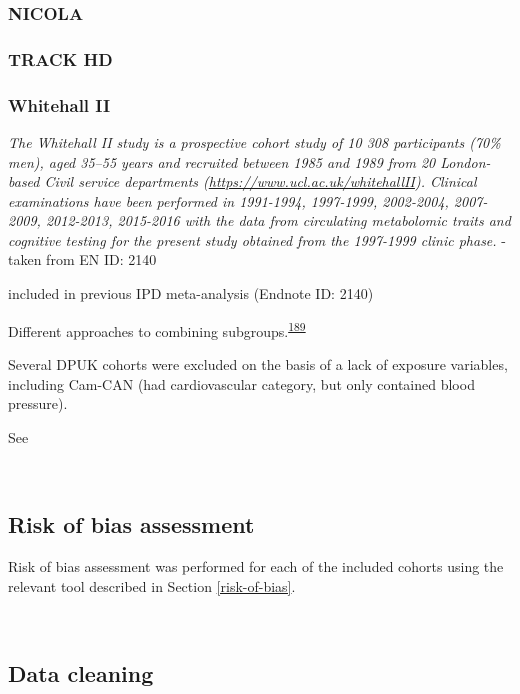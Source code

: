 \documentclass[a4paper, twoside]{templates/ociamthesis}
\begin{document}
\hypertarget{nicola}{%
\subsubsection{NICOLA}\label{nicola}}

\hypertarget{track-hd}{%
\subsubsection{TRACK HD}\label{track-hd}}

\hypertarget{whitehall-ii}{%
\subsubsection{Whitehall II}\label{whitehall-ii}}

\emph{The Whitehall II study is a prospective cohort study of 10 308 participants (70\% men), aged 35--55 years and recruited between 1985 and 1989 from 20 London-based Civil service departments (\url{https://www.ucl.ac.uk/whitehallII}). Clinical examinations have been performed in 1991-1994, 1997-1999, 2002-2004, 2007-2009, 2012-2013, 2015-2016 with the data from circulating metabolomic traits and cognitive testing for the present study obtained from the 1997-1999 clinic phase.} - taken from EN ID: 2140

included in previous IPD meta-analysis (Endnote ID: 2140)

Different approaches to combining subgroups.\textsuperscript{\protect\hyperlink{ref-fisher2017}{189}}

Several DPUK cohorts were excluded on the basis of a lack of exposure variables, including Cam-CAN (had cardiovascular category, but only contained blood pressure).

See

~

\hypertarget{risk-of-bias-assessment}{%
\subsection{Risk of bias assessment}\label{risk-of-bias-assessment}}

Risk of bias assessment was performed for each of the included cohorts using the relevant tool described in Section \ref{risk-of-bias}.

~

\hypertarget{data-cleaning}{%
\subsection{Data cleaning}\label{data-cleaning}}
\end{document}
